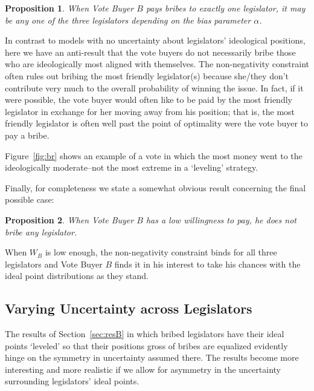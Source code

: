 \documentclass[12pt]{article}
\newtheorem{proposition}{Proposition}
\newcommand{\al}{\alpha}
\begin{document}
\begin{proposition}
  When Vote Buyer $B$ pays bribes to exactly one legislator, it may be any one of the three legislators depending on the bias parameter $\al$.
	\label{prop:1NNB}
\end{proposition}
In contrast to models with no uncertainty about legislators' ideological positions, here we have an anti-result that the vote buyers do not necessarily bribe those who are ideologically most aligned with themselves. The non-negativity constraint often rules out bribing the most friendly legislator(s) because she/they don't contribute very much to the overall probability of winning the issue. In fact, if it were possible, the vote buyer would often like to be paid by the most friendly legislator in exchange for her moving away from his position; that is, the most friendly legislator is often well past the point of optimality were the vote buyer to pay a bribe.

Figure~\ref{fig:br} shows an example of a vote in which the most money went to the ideologically moderate--not the most extreme in a `leveling' strategy.

Finally, for completeness we state a somewhat obvious result concerning the final possible case:

\begin{proposition}
  When Vote Buyer $B$ has a low willingness to pay, he does not bribe any legislator.
	\label{prop:0NNB}
\end{proposition}

When $W_B$ is low enough, the non-negativity constraint binds for all three legislators and Vote Buyer $B$ finds it in his interest to take his chances with the ideal point distributions as they stand.


\subsection{Varying Uncertainty across Legislators}
\label{sec:resunc}

The results of Section~\ref{sec:resB} in which bribed legislators have their ideal points `leveled' so that their positions gross of bribes are equalized evidently hinge on the symmetry in uncertainty assumed there. The results become more interesting and more realistic if we allow for asymmetry in the uncertainty surrounding legislators' ideal points.
\end{document}

